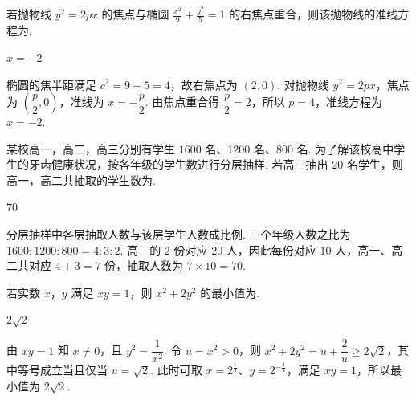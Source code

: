 \begin{problem}
若抛物线 \( y^{2} = 2px \) 的焦点与椭圆 \( \frac{x^2}{9} + \frac{y^2}{5} = 1 \) 的右焦点重合，则该抛物线的准线方程为\fillinblank{}.

\begin{answer}
\(x=-2\)
\end{answer}

\begin{solution}
椭圆的焦半距满足 \(c^2=9-5=4\)，故右焦点为 \((2,0)\). 对抛物线 \(y^2=2px\)，焦点为 \(\left(\dfrac p2,0\right)\)，准线为 \(x=-\dfrac p2\). 由焦点重合得 \(\dfrac p2=2\)，所以 \(p=4\)，准线方程为 \(x=-2\).
\end{solution}
\end{problem}

\begin{problem}
某校高一，高二，高三分别有学生 \(1600\text{ 名}\)、\(1200\text{ 名}\)、\(800\text{ 名}\). 为了解该校高中学生的牙齿健康状况，按各年级的学生数进行分层抽样. 若高三抽出 \(20\text{ 名}\)学生，则高一，高二共抽取的学生数为\fillinblank{}.

\begin{answer}
\(70\)
\end{answer}

\begin{solution}
分层抽样中各层抽取人数与该层学生人数成比例. 三个年级人数之比为 \(1600:1200:800=4:3:2\). 高三的 \(2\) 份对应 \(20\) 人，因此每份对应 \(10\) 人，高一、高二共对应 \(4+3=7\) 份，抽取人数为 \(7\times10=70\).
\end{solution}
\end{problem}

\begin{problem}
若实数 \(x\)，\(y\) 满足 \(xy = 1\)，则 \(x^2 + 2y^2\) 的最小值为\fillinblank{}.

\begin{answer}
\(2\sqrt{2}\)
\end{answer}

\begin{solution}
由 \(xy=1\) 知 \(x\ne0\)，且 \(y^2=\dfrac{1}{x^2}\). 令 \(u=x^2>0\)，则
\(x^2+2y^2=u+\dfrac{2}{u}\geqslant2\sqrt{2}\)，其中等号成立当且仅当 \(u=\sqrt2\). 此时可取 \(x=2^{\frac{1}{4}}\)、\(y=2^{-\frac{1}{4}}\)，满足 \(xy=1\)，所以最小值为 \(2\sqrt2\).
\end{solution}
\end{problem}

